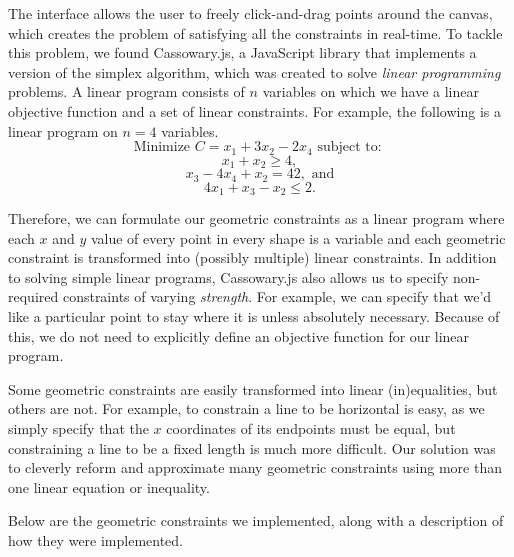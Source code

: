 The interface allows the user to freely click-and-drag points around the canvas, which creates the problem of satisfying all the constraints in real-time. To tackle this problem, we found Cassowary.js, a JavaScript library that implements a version of the simplex algorithm, which was created to solve {\it linear programming} problems.  A linear program consists of $n$ variables on which we have a linear objective function and a set of linear constraints. For example, the following is a linear program on $n=4$ variables.
\[\text{Minimize } C = x_1 + 3x_2 - 2x_4 \text{ subject to: }\]
\[x_1 + x_2 \geq 4,\]
\[x_3 - 4x_4 + x_2 = 42, \text{ and}\]
\[4x_1 + x_3 - x_2 \leq 2.\]

Therefore, we can formulate our geometric constraints as a linear program where each $x$ and $y$ value of every point in every shape is a variable and each geometric constraint is transformed into (possibly multiple) linear constraints. In addition to solving simple linear programs, Cassowary.js also allows us to specify non-required constraints of varying {\it strength}. For example, we can specify that we'd like a particular point to stay where it is unless absolutely necessary. Because of this, we do not need to explicitly define an objective function for our linear program.

Some geometric constraints are easily transformed into linear (in)equalities, but others are not. For example, to constrain a line to be horizontal is easy, as we simply specify that the $x$ coordinates of its endpoints must be equal, but constraining a line to be a fixed length is much more difficult. Our solution was to cleverly reform and approximate many geometric constraints using more than one linear equation or inequality.

Below are the geometric constraints we implemented, along with a description of how they were implemented. 

